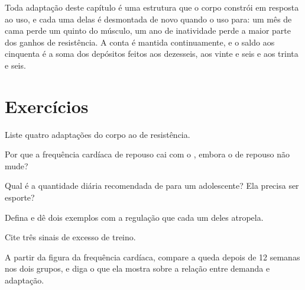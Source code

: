 \begin{remark}\label{rem:g10:sport-and-health:account}
Toda adaptação deste capítulo é uma estrutura que o corpo constrói em
resposta ao uso, e cada uma delas é desmontada de novo quando o uso
para: um mês de cama perde um quinto do músculo, um ano de inatividade
perde a maior parte dos ganhos de resistência. A conta é mantida
continuamente, e o saldo aos cinquenta é a soma dos depósitos feitos
aos dezesseis, aos vinte e seis e aos trinta e seis.
\end{remark}

\section{Exercícios}

\begin{exercise}[$\star$]\label{exo:g10:sport-and-health:1}
Liste quatro adaptações do corpo ao  de resistência.
\end{exercise}

\begin{exercise}[$\star$]\label{exo:g10:sport-and-health:2}
Por que a frequência cardíaca de repouso cai com o , embora
o  de repouso não mude?
\end{exercise}

\begin{exercise}[$\star$]\label{exo:g10:sport-and-health:3}
Qual é a quantidade diária recomendada de  para um
adolescente? Ela precisa ser esporte?
\end{exercise}

\begin{exercise}[$\star$]\label{exo:g10:sport-and-health:4}
Defina  e dê dois exemplos com a regulação que cada um deles
atropela.
\end{exercise}

\begin{exercise}[$\star$]\label{exo:g10:sport-and-health:5}
Cite três sinais de excesso de treino.
\end{exercise}

\begin{exercise}[$\star\star$]\label{exo:g10:sport-and-health:6}
A partir da figura da frequência cardíaca, compare a queda depois de 12
semanas nos dois grupos, e diga o que ela mostra sobre a relação entre
demanda e adaptação.
\end{exercise}

